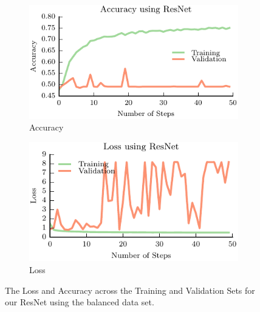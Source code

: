 \documentclass[letterpaper, 10 pt, conference]{../ieeeconf}
\begin{document}
\begin{figure}[t!]
    \begin{subfigure}[t]{0.49\textwidth}
        \includegraphics[width=0.75\columnwidth]{figs/balanced_resnet_accuracy.pdf}
        \caption{Accuracy} \label{fig:accuracy}
        \end{subfigure}
    \begin{subfigure}[t]{0.49\textwidth}
        \includegraphics[width=0.75\columnwidth]{figs/balanced_resnet_loss.pdf}
        \caption{Loss} \label{fig:loss}
    \end{subfigure}
\caption{The Loss and Accuracy across the Training and Validation Sets for our ResNet using the balanced data set.} \label{fig:resnet_results}
\end{figure}
\end{document}
